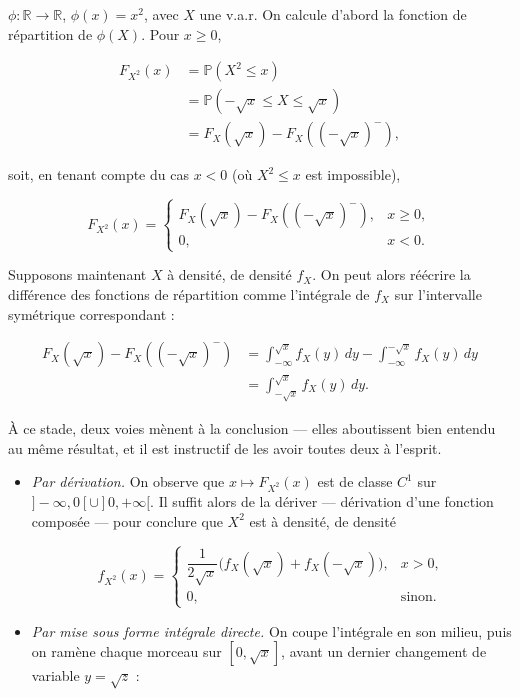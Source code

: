 \begin{exemple}
$\phi : \mathbb{R} \to \mathbb{R}$, $\phi(x) = x^2$, avec $X$ une v.a.r. On calcule d'abord la fonction de répartition de $\phi(X)$. Pour $x \geq 0$,

\begin{align*}
F_{X^2}(x) &= \mathbb{P}(X^2 \leq x) \\
&= \mathbb{P}(-\sqrt{x} \leq X \leq \sqrt{x}) \\
&= F_X(\sqrt{x}) - F_X((-\sqrt{x})^-),
\end{align*}

soit, en tenant compte du cas $x < 0$ (où $X^2 \leq x$ est impossible),

$$
F_{X^2}(x) = \begin{cases} F_X(\sqrt{x}) - F_X((-\sqrt{x})^-), & x \geq 0, \\ 0, & x < 0. \end{cases}
$$

Supposons maintenant $X$ à densité, de densité $f_X$. On peut alors réécrire la différence des fonctions de répartition comme l'intégrale de $f_X$ sur l'intervalle symétrique correspondant :

\begin{align*}
F_X(\sqrt{x}) - F_X((-\sqrt{x})^-) &= \int_{-\infty}^{\sqrt{x}} f_X(y)\, dy - \int_{-\infty}^{-\sqrt{x}} f_X(y)\, dy \\
&= \int_{-\sqrt{x}}^{\sqrt{x}} f_X(y)\, dy.
\end{align*}

À ce stade, deux voies mènent à la conclusion — elles aboutissent bien entendu au même résultat, et il est instructif de les avoir toutes deux à l'esprit.

\begin{itemize}
\item \emph{Par dérivation.} On observe que $x \mapsto F_{X^2}(x)$ est de classe $C^1$ sur $]-\infty, 0[ \cup ]0, +\infty[$. Il suffit alors de la dériver — dérivation d'une fonction composée — pour conclure que $X^2$ est à densité, de densité

$$
f_{X^2}(x) = \begin{cases} \dfrac{1}{2\sqrt{x}} \big(f_X(\sqrt{x}) + f_X(-\sqrt{x})\big), & x > 0, \\[6pt] 0, & \text{sinon.} \end{cases}
$$

\item \emph{Par mise sous forme intégrale directe.} On coupe l'intégrale en son milieu, puis on ramène chaque morceau sur $[0, \sqrt{x}]$, avant un dernier changement de variable $y = \sqrt{z}$ :


\end{itemize}
\end{exemple}
